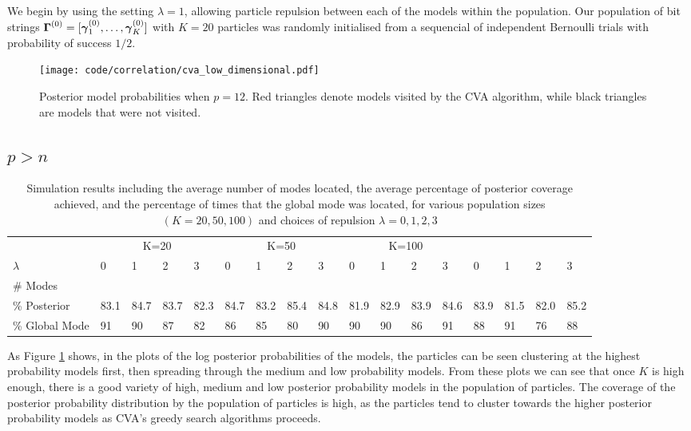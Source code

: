 \documentclass{amsart}[12pt]
\begin{document}
We begin by using the setting $\lambda = 1$, allowing particle repulsion between each of the models within the
population. Our population of bit strings ${\boldsymbol \Gamma}^{(0)} = [{\boldsymbol \gamma}_1^{(0)}, \ldots, {\boldsymbol \gamma}_K^{(0)}]$ with
$K = 20$ particles was randomly initialised from a sequencial of independent Bernoulli trials with probability
of success $1/2$.

\begin{figure}	
	\caption{Posterior model probabilities when $p = 12$. Red triangles denote models visited by the CVA
						algorithm, while black triangles are models that were not visited.}
	\label{fig:cva_posterior_models}
	\texttt{[image: code/correlation/cva\_low\_dimensional.pdf]}
\end{figure}

\subsection{$p > n$}

\begin{table}
	\caption{Simulation results including the average number of modes located, the average percentage of
	posterior coverage achieved, and the percentage of times that the global mode was located, for various
	population sizes $(K=20, 50, 100)$ and choices of repulsion $\lambda=0, 1, 2, 3$}
	\label{tab:result2}
	\begin{tabular}{l|llll|llll|llll|llll}
	\hline
	 					& \multicolumn{4}{c}{K=20} 	& \multicolumn{4}{c}{K=50} & \multicolumn{4}{c}{K=100} \\
	$\lambda$ & 0 & 1 & 2 & 3 & 0 & 1 & 2 & 3 & 0 & 1 & 2 & 3 & 0 & 1 & 2 & 3 \\
	\hline
	\# Modes & \\
	\% Posterior & 83.1 & 84.7 & 83.7 & 82.3 & 84.7 & 83.2 & 85.4 & 84.8 & 81.9 & 82.9 & 83.9 & 84.6 & 83.9 & 81.5 & 82.0 & 85.2 \\
	\% Global Mode & 91 & 90 & 87 & 82 & 86 & 85 & 80 & 90 & 90 & 90 & 86 & 91 & 88 & 91 & 76 & 88 \\
	\hline
	\end{tabular}

\end{table}

As Figure \ref{fig:cva_posterior_models} shows, 
in the plots of the log posterior probabilities of the models, the particles can be seen clustering at the
highest probability models first, then spreading through the medium and low probability models. From these
plots we can see that once $K$ is high enough, there is a good variety of high, medium and low posterior
probability models in the population of particles. The coverage of the posterior probability distribution
by the population of particles is high, as the particles tend to cluster towards the higher posterior
probability models as CVA's greedy search algorithms proceeds.
\end{document}
